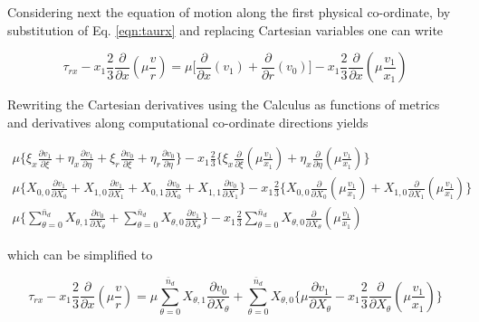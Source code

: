 	Considering next the equation of motion along the first physical co-ordinate, by substitution
of Eq. \ref{eqn:taurx} and replacing Cartesian variables one can write

\begin{displaymath}
	\tau_{rx} - x_1\frac{2}{3}\frac{\partial}{\partial x}(\mu \frac{v}{r}) = \mu\Big[\frac{\partial}{\partial x}(v_1) 
	+ \frac{\partial}{\partial r}(v_0)\Big] - x_1\frac{2}{3} \frac{\partial}{\partial x}(\mu \frac{v_1}{x_1})
\end{displaymath}

	Rewriting the Cartesian derivatives using the Calculus as functions of metrics and derivatives along
computational co-ordinate directions yields

\begin{displaymath}
  \begin{array}{c}
	\mu \Big\{\xi_x \frac{\partial v_1}{\partial \xi} + \eta_x \frac{\partial v_1}{\partial \eta} 
	+ \xi_r \frac{\partial v_0}{\partial \xi} + \eta_r \frac{\partial v_0}{\partial \eta}\Big\}
	- x_1 \frac{2}{3} \Big\{\xi_x \frac{\partial}{\partial \xi}(\mu \frac{v_1}{x_1}) 
	+ \eta_x \frac{\partial}{\partial \eta}(\mu \frac{v_1}{x_1}) \Big\}  
	\\
	\mu \Big\{X_{0,0} \frac{\partial v_1}{\partial X_0} + X_{1,0} \frac{\partial v_1}{\partial X_1} 
	+ X_{0,1} \frac{\partial v_0}{\partial X_0} + X_{1,1} \frac{\partial v_0}{\partial X_1}\Big\}
	- x_1 \frac{2}{3} \Big\{X_{0,0} \frac{\partial}{\partial X_0}(\mu \frac{v_1}{x_1}) 
	+ X_{1,0} \frac{\partial}{\partial X_1}(\mu \frac{v_1}{x_1}) \Big\}  
	\\
	\mu \Big\{ \sum_{\theta = 0}^{\bar{n}_d} X_{\theta,1}\frac{\partial v_0}{\partial X_\theta}
	+ \sum_{\theta = 0}^{\bar{n}_d} X_{\theta,0} \frac{\partial v_1}{\partial X_\theta} \Big\}
	- x_1 \frac{2}{3} \sum_{\theta = 0}^{\bar{n}_d} X_{\theta,0} \frac{\partial}{\partial X_\theta}
	(\mu \frac{v_1}{x_1})
  \end{array}
\end{displaymath}

	which can be simplified to 

\begin{equation}
	\tau_{rx} - x_1\frac{2}{3}\frac{\partial}{\partial x}(\mu \frac{v}{r}) =
	\mu \sum_{\theta = 0}^{\bar{n}_d} X_{\theta,1}\frac{\partial v_0}{\partial X_\theta}
	+ \sum_{\theta = 0}^{\bar{n}_d} X_{\theta,0} \Big\{\mu \frac{\partial v_1}{\partial X_\theta} 
	- x_1 \frac{2}{3} \frac{\partial}{\partial X_\theta}(\mu \frac{v_1}{x_1}) \Big\}
\label{eqn:xmomcomp}
\end{equation}

